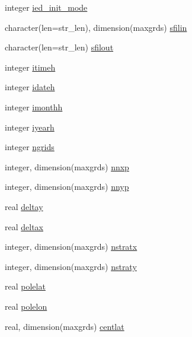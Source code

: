 \begin{DoxyCompactItemize}
\item 
integer \hyperlink{structename__coms_1_1ename__vars_aab79eabd9208f4c84290572f7ee4c1e9}{ied\+\_\+init\+\_\+mode}
\item 
character(len=str\+\_\+len), dimension(maxgrds) \hyperlink{structename__coms_1_1ename__vars_a0b29a735224c75012629c5b99e08dad6}{sfilin}
\item 
character(len=str\+\_\+len) \hyperlink{structename__coms_1_1ename__vars_a88267d1c2a655cba72220200c9309fec}{sfilout}
\item 
integer \hyperlink{structename__coms_1_1ename__vars_aeb4babbd3641a5db49f5cedd66ab75f1}{itimeh}
\item 
integer \hyperlink{structename__coms_1_1ename__vars_ab762a13a2d0d886ecb90c48121b426e1}{idateh}
\item 
integer \hyperlink{structename__coms_1_1ename__vars_a8e815c0fae64b7126baceed75ce5684c}{imonthh}
\item 
integer \hyperlink{structename__coms_1_1ename__vars_af59e57bb629047fdc4a9c1d20aa25190}{iyearh}
\item 
integer \hyperlink{structename__coms_1_1ename__vars_a188ee24153c0efbff513b111a2974702}{ngrids}
\item 
integer, dimension(maxgrds) \hyperlink{structename__coms_1_1ename__vars_a61c9ad7df12f3f877d662d06cb6ffbc3}{nnxp}
\item 
integer, dimension(maxgrds) \hyperlink{structename__coms_1_1ename__vars_a78f5195405e4762d44f5330309410df5}{nnyp}
\item 
real \hyperlink{structename__coms_1_1ename__vars_aade9f56710b26698a81600b5721bbdfb}{deltay}
\item 
real \hyperlink{structename__coms_1_1ename__vars_a96e49869b2faab6b636d98578c53e31e}{deltax}
\item 
integer, dimension(maxgrds) \hyperlink{structename__coms_1_1ename__vars_affb9ef2b9d0127ff4ec554b29cde4839}{nstratx}
\item 
integer, dimension(maxgrds) \hyperlink{structename__coms_1_1ename__vars_a1cd26ec782ee2424dfde262a117a5fac}{nstraty}
\item 
real \hyperlink{structename__coms_1_1ename__vars_ada075e015603fe6386286ca72d596535}{polelat}
\item 
real \hyperlink{structename__coms_1_1ename__vars_a7a3b394535aede3766a81f6637761114}{polelon}
\item 
real, dimension(maxgrds) \hyperlink{structename__coms_1_1ename__vars_ae0b3e6aab019c8025c40ae91aa492f85}{centlat}
\item 

\end{DoxyCompactItemize}
